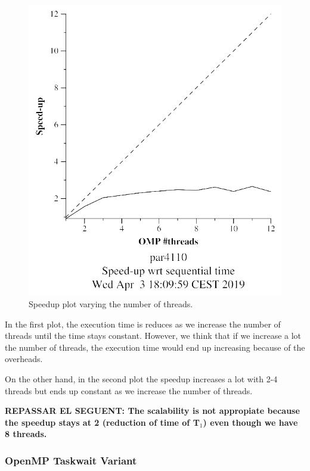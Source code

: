 \documentclass[12pt, a4paper]{article}
\begin{document}
\begin{figure}[H]
\begin{minipage}[b]{0.4\linewidth}
  \includegraphics[scale=0.5]{./mandel-omp-10000-strong-21-speedup}
  \caption{Speedup plot varying the number of threads.}
  \label{fig:mandel-omp-10000-strong-21-speedup}
\end{minipage}
\end{figure}

In the first plot, the execution time is reduces as we increase the number of threads until the time stays constant. However, we think that if we increase a lot the number of threads, the execution time would end up increasing because of the overheads.

On the other hand, in the second plot the speedup increases a lot with 2-4 threads but ends up constant as we increase the number of threads.

\textbf{\large{\large{REPASSAR EL SEGUENT: The scalability is not appropiate because the speedup stays at 2 (reduction of time of T$_1$) even though we have 8 threads.}}}

\subsubsection{OpenMP Taskwait Variant}
\end{document}
